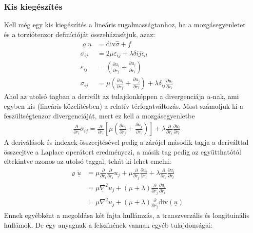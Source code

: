 \documentclass{article}
\begin{document}
\subsubsection{Kis kiegészítés}
Kell még egy kis kiegészítés a lineáris rugalmasságtanhoz, ha a mozgásegyenletet és a torziótenzor definícióját összeházasítjuk, azaz:
\begin{align*}
\varrho \underline{\ddot{u}} &= \mathrm{div} \hat{\sigma} + \underline{f} \\
\sigma_{ij} &= 2\mu \varepsilon_{ij} + \lambda \delta{ij} \epsilon_{ll} \\
\varepsilon_{ij} &= \left( \frac{\partial u_i}{\partial r_j} + \frac{\partial u_j}{\partial r_i}\right) \\ 
\sigma_{ij} &= \mu \left( \frac{\partial u_i}{\partial r_j} + \frac{\partial u_j}{\partial r_i}\right) + \lambda \delta_{ij} \frac{\partial u_l}{\partial r_l} 
\end{align*}
Ahol az utolsó tagban a derivált az tulajdonképpen a divergenciája $u$-nak, ami egyben kis (lineáris közelítésben) a relatív térfogatváltozás. Most számoljuk ki a feszültségtenzor divergenciáját, mert ez kell a mozgásegyenletbe
\begin{align*}
\frac{\partial}{\partial r_i}\sigma_{ij} = \frac{\partial}{\partial r_i} \left[ \mu \left( \frac{\partial u_i}{\partial r_j} + \frac{\partial u_j}{\partial r_i}\right)  \right] + \lambda \frac{\partial}{\partial r_i} \frac{\partial u_l}{\partial r_l}
\end{align*}
A deriválások és indexek összeejtésével pedig a zárójel második tagja a deriválttal összeejtve a Laplace operátort eredményezi, a másik tag pedig az együtthatótól eltekintve azonos az utolsó taggal, tehát ki lehet emelni:
\begin{align*}
\varrho \ddot{\underline{u}} &= \mu \frac{\partial}{\partial r_i}\frac{\partial}{\partial r_i} u_j + \mu \frac{\partial}{\partial r_j}\frac{\partial u_i}{\partial r_i} + \lambda \frac{\partial}{\partial r_i}\frac{\partial u_l}{\partial r_l } \\
&= \mu \underline{\nabla}^2 u_j + (\mu+\lambda) \frac{\partial}{\partial r_j}\frac{\partial u_i}{\partial r_i} \\
&= \mu \underline{\nabla}^2 u_j + (\mu+\lambda) \frac{\partial}{\partial r_j}\mathrm{div}(\underline{u})
\end{align*}
Ennek egyébként a megoldása két fajta hullámzás, a transzverzális és longituinális hullámok.
De egy anyagnak a felszínének vannak egyéb tulajdonságai:
\end{document}
